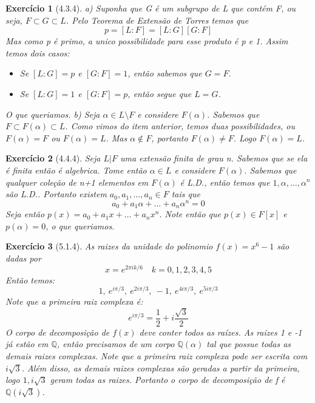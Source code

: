 \documentclass{article}
\newtheorem*{ex}{Exercício}
\begin{document}
\begin{ex}[4.3.4]
    a) Suponha que G é um subgrupo de L que contém F, ou seja, $F \subset G \subset L$.
    Pelo Teorema de Extensão de Torres temos que
    \[ p = [L:F] = [L:G][G:F]\]
    Mas como p é primo, a unico possibilidade para esse produto é p e 1.
    Assim temos dois casos:
    \begin{itemize}
        \item Se $[L:G] = p$ e $[G:F] = 1$, então sabemos que $G = F$.
        \item Se $[L:G] = 1$ e $[G:F] = p$, então segue que $L = G$.
    \end{itemize}
    O que queriamos.
    b) Seja $\alpha \in L \setminus F$ e considere $F(\alpha)$. 
    Sabemos que $F \subset F(\alpha) \subset L$.
    Como vimos do item anterior, temos duas possibilidades, ou $F(\alpha) = F$ ou $F(\alpha) = L$.
    Mas $\alpha \notin F$, portanto $F(\alpha) \neq F$. Logo $F(\alpha) = L$.
\end{ex}

\begin{ex}[4.4.4]
    Seja $L | F$ uma extensão finita de grau n. Sabemos que se ela é finita então é algebrica.
    Tome então $\alpha \in L$ e considere $F(\alpha)$. 
    Sabemos que qualquer coleção de n+1 elementos em $F(\alpha)$ é L.D., então temos que 
    $1, \alpha, \dots, \alpha^n$ são L.D..
    Portanto existem $a_0, a_1, \dots, a_n \in F$ tais que 
    \[a_0 + a_1\alpha + \dots + a_n \alpha^n = 0\]
    Seja então $p(x) = a_0 + a_1 x + \dots + a_n x^n$. 
    Note então que $p(x) \in F[x]$ e $p(\alpha) = 0$, o que queriamos.
\end{ex}

\begin{ex}[5.1.4]
    As raizes da unidade do polinomio $f(x) = x^6 - 1$ são dadas por
    \[x = e^{2 \pi i k / 6} \quad k = 0, 1, 2, 3, 4, 5\]
    Então temos:
    \[1, \ e^{i \pi /3}, \ e^{2 i \pi /3}, \ -1, \ e^{4 i \pi /3}, \ e^{5 i \pi /3}\]
    Note que a primeira raiz complexa é:
    \[e^{i \pi /3} = \frac{1}{2} + i \frac{\sqrt{3}}{2}\]
    O corpo de decomposição de $f(x)$ deve conter todos as raízes. 
    As raizes 1 e -1 já estão em $\mathbb{Q}$, então precisamos de um corpo $\mathbb{Q}(\alpha)$ tal que 
    possue todas as demais raizes complexas.
    Note que a primeira raiz complexa pode ser escrita com $i\sqrt{3}$. 
    Além disso, as demais raizes complexas são geradas a partir da primeira, logo ${1, i\sqrt{3}}$ geram todas as raizes.
    Portanto o corpo de decomposição  de f é $\mathbb{Q}(i\sqrt{3})$.
\end{ex}
\end{document}
